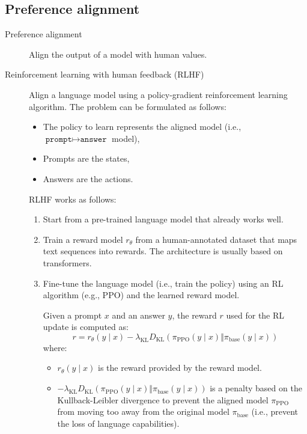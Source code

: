 \subsection{Preference alignment}

\begin{description}
    \item[Preference alignment] 
        Align the output of a model with human values.

    \item[Reinforcement learning with human feedback (RLHF)] 
        Align a language model using a policy-gradient reinforcement learning algorithm. The problem can be formulated as follows:
        \begin{itemize}
            \item The policy to learn represents the aligned model (i.e., $\texttt{prompt} \mapsto \texttt{answer}$ model),
            \item Prompts are the states,
            \item Answers are the actions.
        \end{itemize}
        RLHF works as follows:
        \begin{enumerate}
            \item Start from a pre-trained language model that already works well.

            \item Train a reward model $r_\theta$ from a human-annotated dataset that maps text sequences into rewards. The architecture is usually based on transformers.

            \item Fine-tune the language model (i.e., train the policy) using an RL algorithm (e.g., PPO) and the learned reward model. 

            Given a prompt $x$ and an answer $y$, the reward $r$ used for the RL update is computed as:
            \[ r = r_\theta(y \mid x) - \lambda_\text{KL} D_\text{KL}(\pi_{\text{PPO}}(y \mid x) \Vert \pi_{\text{base}}(y \mid x)) \]
            where:
            \begin{itemize}
                \item $r_\theta(y \mid x)$ is the reward provided by the reward model.
                \item $- \lambda_\text{KL} D_\text{KL}(\pi_{\text{PPO}}(y \mid x) \Vert \pi_{\text{base}}(y \mid x))$ is a penalty based on the Kullback-Leibler divergence to prevent the aligned model $\pi_\text{PPO}$ from moving too away from the original model $\pi_\text{base}$ (i.e., prevent the loss of language capabilities).
            \end{itemize}
        \end{enumerate}


\end{description}
